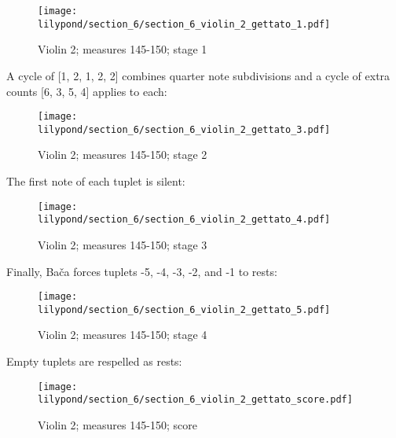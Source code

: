 \setcounter{figure}{42}
\setcounter{subFigure}{1}
\renewcommand{\thefigure}{\thechapter.\arabic{figure}.\alph{subFigure}}
\begin{figure}[H]
    \texttt{[image: lilypond/section\_6/section\_6\_violin\_2\_gettato\_1.pdf]}
     \caption{Violin 2; measures 145-150; stage 1}
    \label{fig:section-6-violin-2-gettato-1}
\end{figure}



A cycle of [1, 2, 1, 2, 2] combines quarter note subdivisions and a cycle of extra counts [6, 3, 5, 4] applies to each:

\setcounter{figure}{42}
\setcounter{subFigure}{2}
\begin{figure}[H]
    \texttt{[image: lilypond/section\_6/section\_6\_violin\_2\_gettato\_3.pdf]}
     \caption{Violin 2; measures 145-150; stage 2}
    \label{fig:section-6-violin-2-gettato-3}
\end{figure}

The first note of each tuplet is silent:

\setcounter{figure}{42}
\setcounter{subFigure}{3}
\begin{figure}[H]
    \texttt{[image: lilypond/section\_6/section\_6\_violin\_2\_gettato\_4.pdf]}
     \caption{Violin 2; measures 145-150; stage 3}
    \label{fig:section-6-violin-2-gettato-4}
\end{figure}

Finally, Bača forces tuplets -5, -4, -3, -2, and -1 to rests:

\setcounter{figure}{42}
\setcounter{subFigure}{4}
\begin{figure}[H]
    \texttt{[image: lilypond/section\_6/section\_6\_violin\_2\_gettato\_5.pdf]}
     \caption{Violin 2; measures 145-150; stage 4}
    \label{fig:section-6-violin-2-gettato-5}
\end{figure}

Empty tuplets are respelled as rests:

\setcounter{figure}{42}
\setcounter{subFigure}{5}
\begin{figure}[H]
    \texttt{[image: lilypond/section\_6/section\_6\_violin\_2\_gettato\_score.pdf]}
     \caption{Violin 2; measures 145-150; score}
    \label{fig:section-6-violin-2-gettato-5-final}
\end{figure}

